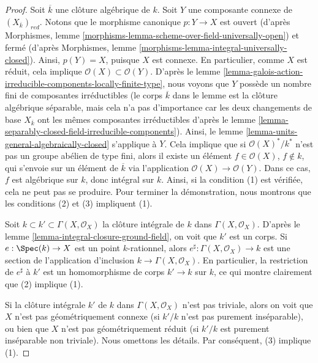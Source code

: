 \begin{proof}
 Soit $\overline{k}$ une clôture algébrique de $k$.
Soit $Y$ une composante connexe de $(X_{\overline{k}})_{red}$.
Notons que le morphisme canonique $p : Y \to X$ est ouvert
(d'après Morphismes, lemme \ref{morphisms-lemma-scheme-over-field-universally-open})
et fermé
(d'après Morphismes, lemme \ref{morphisms-lemma-integral-universally-closed}).
Ainsi, $p(Y) = X$, puisque $X$ est connexe. En particulier, comme 
$X$ est réduit, cela implique $\mathcal{O}(X) \subset \mathcal{O}(Y)$. D'après
le lemme \ref{lemma-galois-action-irreducible-components-locally-finite-type},
nous voyons que $Y$ possède un nombre fini de composantes irréductibles (le corps 
$\overline{k}$ dans le lemme est la clôture algébrique séparable, mais cela
n'a pas d'importance car les deux changements de base $X_{\overline{k}}$
 ont les mêmes composantes irréductibles d'après le
lemme \ref{lemma-separably-closed-field-irreducible-components}). Ainsi,
le lemme \ref{lemma-units-general-algebraically-closed}
 s'applique à $Y$. Cela implique que si $\mathcal{O}(X)^*/k^*$
 n'est pas un groupe abélien de type fini, alors il existe un élément 
$f \in \mathcal{O}(X)$, $f \not \in k$, qui s'envoie sur un élément de 
$\overline{k}$ via l'application $\mathcal{O}(X) \to \mathcal{O}(Y)$.
Dans ce cas, $f$ est algébrique sur $k$,
donc intégral sur $k$. Ainsi, si la condition (1) est vérifiée, cela ne peut pas se
produire. Pour terminer la démonstration, nous montrons que les conditions (2) et (3) impliquent (1).

\medskip\noindent
 Soit $k \subset k' \subset \Gamma(X, \mathcal{O}_X)$ la clôture
intégrale de $k$ dans $\Gamma(X, \mathcal{O}_X)$. D'après
le lemme \ref{lemma-integral-closure-ground-field},
on voit que $k'$ est un corps.
Si $e : \Spec(k) \to X$ est un point $k$-rationnel, alors 
$e^\sharp : \Gamma(X, \mathcal{O}_X) \to k$ est une section
de l'application d'inclusion $k \to \Gamma(X, \mathcal{O}_X)$. En particulier,
la restriction de $e^\sharp$ à $k'$ est un homomorphisme de corps $k' \to k$ sur $k$,
ce qui montre clairement que (2) implique (1).

\medskip\noindent
 Si la clôture intégrale $k'$ de $k$ dans $\Gamma(X, \mathcal{O}_X)$
 n'est pas triviale, alors on voit que $X$ n'est pas géométriquement connexe 
(si $k'/k$ n'est pas purement inséparable), ou bien que $X$ n'est pas
géométriquement réduit (si $k'/k$ est purement inséparable non triviale). Nous omettons
les détails. Par conséquent, (3) implique (1). 
\end{proof}

